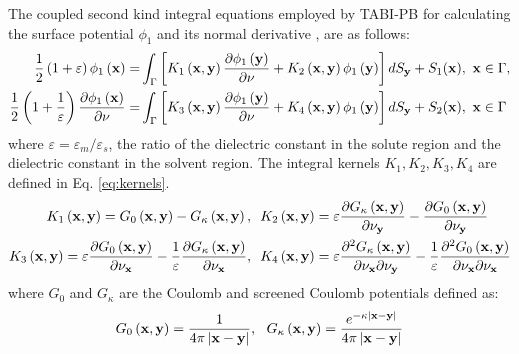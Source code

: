 \documentclass[journal=jpcbfk, manuscript=article]{achemso}
\begin{document}
The coupled second kind integral equations employed by TABI-PB for calculating the surface potential $\phi_1$ and its normal derivative \cite{Juffer1991}, are as follows: 
%
\begin{equation}\label{eq:integraleq}
\begin{split}
\frac{1}{2}\left(1+\varepsilon\right)\phi_1\left({\bf x}\right) =& \int_\Gamma\left[K_1\left({\bf x}, {\bf y}\right) \frac{\partial \phi_1\left({\bf y}\right)}{\partial \nu} + K_2\left({\bf x}, {\bf y}\right) \phi_1\left({\bf y}\right) \right]dS_{\bf y} + S_1({\bf x}), \ {\bf x} \in \Gamma, \\ %
\frac{1}{2}\left(1+\frac{1}{\varepsilon}\right) \frac{\partial \phi_1\left({\bf x}\right)}{\partial \nu} =& \int_\Gamma\left[K_3\left({\bf x}, {\bf y}\right) \frac{\partial \phi_1\left({\bf y}\right)}{\partial \nu} + K_4\left({\bf x}, {\bf y}\right) \phi_1\left({\bf y}\right) \right]dS_{\bf y} + S_2({\bf x}), \ {\bf x} \in \Gamma 
\end{split} \end{equation} 
%
where $\varepsilon = \varepsilon_m / \varepsilon_s$, the ratio of the dielectric constant in the solute region and the dielectric constant in the solvent region. The integral kernels $K_1, K_2, K_3, K_4$ are defined in Eq. \ref{eq:kernels}.
%
\begin{equation}
\begin{split}
K_1\left({\bf x}, {\bf y}\right) = G_0\left({\bf x}, {\bf y}\right) - G_\kappa\left({\bf x}, {\bf y}\right),& \ \ K_2\left({\bf x}, {\bf y}\right) = \varepsilon \frac{\partial G_\kappa\left({\bf x}, {\bf y}\right)}{\partial \nu_{\bf y}}
-\frac{\partial G_0\left({\bf x}, {\bf y}\right)}{\partial \nu_{\bf y}} \\ K_3\left({\bf x}, {\bf y}\right) = \varepsilon \frac{\partial G_0\left({\bf x}, {\bf y}\right)}{\partial \nu_{\bf x}}
-\frac{1}{\varepsilon}\frac{\partial G_\kappa\left({\bf x}, {\bf y}\right)}{\partial \nu_{\bf x}},& \ \ K_4\left({\bf x}, {\bf y}\right) = \varepsilon \frac{\partial^2 G_\kappa\left({\bf x}, {\bf y}\right)}{\partial \nu_{\bf x} \partial \nu_{\bf y}}
-\frac{1}{\varepsilon}\frac{\partial^2 G_0\left({\bf x}, {\bf y}\right)}{\partial \nu_{\bf x} \partial \nu_{\bf x}}
\label{eq:kernels}
\end{split} \end{equation}
%
where $G_0$ and $G_\kappa$ are the Coulomb and screened Coulomb potentials defined as:
%
\begin{equation}
G_0\left({\bf x}, {\bf y}\right) = \frac{1}{4\pi \left|{\bf x} - {\bf y}\right|}, \ \ G_\kappa\left({\bf x}, {\bf y}\right) = \frac{e^{-\kappa\left|{\bf x} - {\bf y}\right|}}{4\pi \left|{\bf x} - {\bf y}\right|} 
\end{equation}
\end{document}
